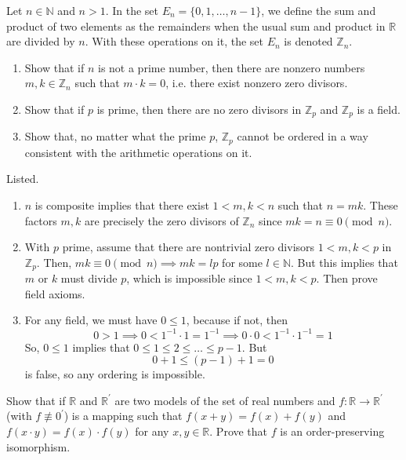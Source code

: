 \documentclass{article}
\begin{document}
    \begin{exercise}[Zorich 2.2.22]
    Let $n \in \mathbb{N}$ and $n > 1$. In the set $E_n = \{0, 1, \ldots, n-1\}$, we define the sum and product of two elements as the remainders when the usual sum and product in $\mathbb{R}$ are divided by $n$. With these operations on it, the set $E_n$ is denoted $\mathbb{Z}_n$. 
    \begin{enumerate}
        \item Show that if $n$ is not a prime number, then there are nonzero numbers $m, k \in \mathbb{Z}_n$ such that $m \cdot k = 0$, i.e. there exist nonzero zero divisors. 
        \item Show that if $p$ is prime, then there are no zero divisors in $\mathbb{Z}_p$ and $\mathbb{Z}_p$ is a field. 
        \item Show that, no matter what the prime $p$, $\mathbb{Z}_p$ cannot be ordered in a way consistent with the arithmetic operations on it. 
    \end{enumerate}
    \end{exercise}

    \begin{solution}
    Listed. 
    \begin{enumerate}
        \item $n$ is composite implies that there exist $1 < m, k < n$ such that $n = m k$. These factors $m, k$ are precisely the zero divisors of $\mathbb{Z}_n$ since $m k = n \equiv 0 \pmod{n}$. 
        \item With $p$ prime, assume that there are nontrivial zero divisors $1 < m, k < p$ in $\mathbb{Z}_p$. Then, $m k \equiv 0 \pmod{n} \implies m k = l p$ for some $l \in \mathbb{N}$. But this implies that $m$ or $k$ must divide $p$, which is impossible since $1 < m, k < p$. Then prove field axioms. 
        \item For any field, we must have $0 \leq 1$, because if not, then 
        \[0 > 1 \implies 0 < 1^{-1} \cdot 1 = 1^{-1} \implies 0 \cdot 0 < 1^{-1} \cdot 1^{-1} = 1\]
        So, $0 \leq 1$ implies that $0 \leq 1 \leq 2 \leq \ldots \leq p-1$. But 
        \[0 + 1 \leq (p - 1) + 1 = 0\]
        is false, so any ordering is impossible. 
    \end{enumerate}
    \end{solution}

    \begin{exercise}[Zorich 2.2.23]
    Show that if $\mathbb{R}$ and $\mathbb{R}^\prime$ are two models of the set of real numbers and $f: \mathbb{R} \longrightarrow \mathbb{R}^\prime$ (with $f \not\equiv 0^\prime$) is a mapping such that $f(x + y) = f(x) + f(y)$ and $f(x \cdot y) = f(x) \cdot f(y)$ for any $x, y \in \mathbb{R}$. Prove that $f$ is an order-preserving isomorphism. 
    \end{exercise}
\end{document}

